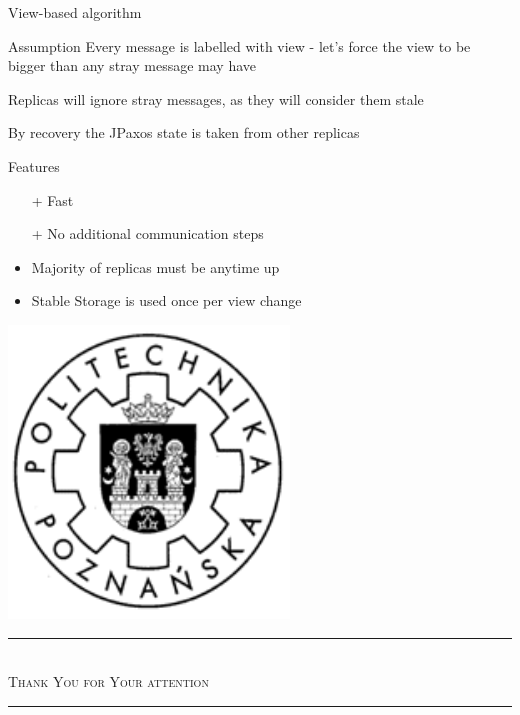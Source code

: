 \documentclass[hyperref={pdfpagelabels=true},11pt,compress,trans]{beamer}
\begin{document}
\begin{frame}{View-based algorithm}
 \begin{block}{Assumption}
  Every message is labelled with view - let's force the view to be bigger than any stray message may have

  Replicas will ignore stray messages, as they will consider them stale

  By recovery the JPaxos state is taken from other replicas
 \end{block}
 \begin{block}{Features}
  \vspace{-1em}\vspace{-\parskip}\vspace{-\lineskip}
  \begin{itemize}
   \item[+]  Fast
   \item[+]  No additional communication steps
   \item     Majority of replicas must be anytime up
   \item     Stable Storage is used once per view change
  \end{itemize}
 \end{block}
\end{frame}

{
 \logo
{
  \includegraphics[keepaspectratio,height=0.2\textheight]{images/put_logo.pdf} \hspace*{3.5em}
}

\begin{frame}{}
  \rmfamily\Large
  \begin{center}
      \par\noindent\ignorespaces\rule{0.9\textwidth}{0.05em} \\
      \textsc{Thank You for Your attention} \\ \vspace{-\parskip}
      \rule{0.9\textwidth}{0.05em}
  \end{center}
\end{frame}

}
\end{document}
